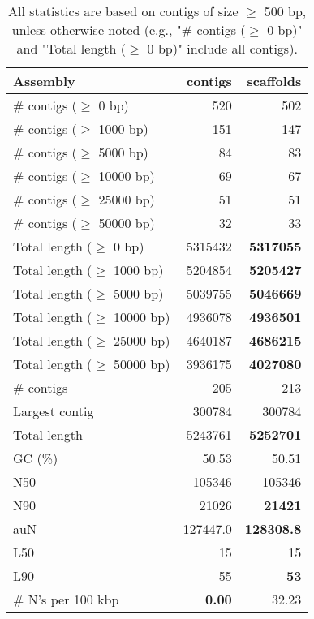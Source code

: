 \documentclass[12pt,a4paper]{article}
\begin{document}
\begin{table}[ht]
\begin{center}
\caption{All statistics are based on contigs of size $\geq$ 500 bp, unless otherwise noted (e.g., "\# contigs ($\geq$ 0 bp)" and "Total length ($\geq$ 0 bp)" include all contigs).}
\begin{tabular}{|l*{2}{|r}|}
\hline
Assembly & contigs & scaffolds \\ \hline
\# contigs ($\geq$ 0 bp) & 520 & 502 \\ \hline
\# contigs ($\geq$ 1000 bp) & 151 & 147 \\ \hline
\# contigs ($\geq$ 5000 bp) & 84 & 83 \\ \hline
\# contigs ($\geq$ 10000 bp) & 69 & 67 \\ \hline
\# contigs ($\geq$ 25000 bp) & 51 & 51 \\ \hline
\# contigs ($\geq$ 50000 bp) & 32 & 33 \\ \hline
Total length ($\geq$ 0 bp) & 5315432 & {\bf 5317055} \\ \hline
Total length ($\geq$ 1000 bp) & 5204854 & {\bf 5205427} \\ \hline
Total length ($\geq$ 5000 bp) & 5039755 & {\bf 5046669} \\ \hline
Total length ($\geq$ 10000 bp) & 4936078 & {\bf 4936501} \\ \hline
Total length ($\geq$ 25000 bp) & 4640187 & {\bf 4686215} \\ \hline
Total length ($\geq$ 50000 bp) & 3936175 & {\bf 4027080} \\ \hline
\# contigs & 205 & 213 \\ \hline
Largest contig & 300784 & 300784 \\ \hline
Total length & 5243761 & {\bf 5252701} \\ \hline
GC (\%) & 50.53 & 50.51 \\ \hline
N50 & 105346 & 105346 \\ \hline
N90 & 21026 & {\bf 21421} \\ \hline
auN & 127447.0 & {\bf 128308.8} \\ \hline
L50 & 15 & 15 \\ \hline
L90 & 55 & {\bf 53} \\ \hline
\# N's per 100 kbp & {\bf 0.00} & 32.23 \\ \hline
\end{tabular}
\end{center}
\end{table}
\end{document}
